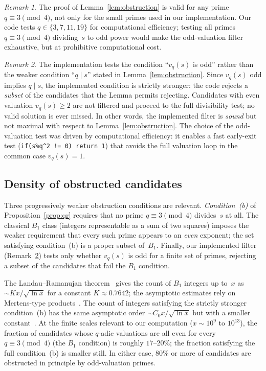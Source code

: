 \documentclass[11pt]{article}
\theoremstyle{definition}
\theoremstyle{remark}
\newtheorem{remark}{Remark}
\numberwithin{equation}{section}
\newcommand{\vq}[1]{v_{#1}}
\begin{document}
\begin{remark}\label{rem:filter_general}
The proof of Lemma~\ref{lem:obstruction} is valid for any prime
$q \equiv 3 \pmod{4}$, not only for the small primes used in our
implementation.  Our code tests $q \in \{3, 7, 11, 19\}$ for
computational efficiency; testing all primes $q \equiv 3 \pmod{4}$
dividing~$s$ to odd power would make the odd-valuation filter
exhaustive, but at prohibitive computational cost.
\end{remark}

\begin{remark}\label{rem:implemented_filter}
The implementation tests the condition ``$\vq{q}(s)$ is odd''
rather than the weaker condition ``$q \mid s$'' stated in
Lemma~\textup{\ref{lem:obstruction}}.
Since $\vq{q}(s)$ odd implies $q \mid s$, the implemented
condition is strictly stronger: the code rejects a
\emph{subset} of the candidates that the Lemma permits
rejecting.  Candidates with even valuation $\vq{q}(s) \ge 2$
are not filtered and proceed to the full divisibility test;
no valid solution is ever missed.  In other words, the
implemented filter is \emph{sound} but not maximal with
respect to Lemma~\textup{\ref{lem:obstruction}}.
The choice of the odd-valuation test was driven by
computational efficiency: it enables a fast early-exit test
(\texttt{if(s\%q\^{}2 != 0) return 1}) that avoids
the full valuation loop in the common case $\vq{q}(s) = 1$.
\end{remark}

\subsection{Density of obstructed candidates}

Three progressively weaker obstruction conditions are relevant.
\emph{Condition~\textup{(b)}} of Proposition~\ref{prop:qr}
requires that no prime $q \equiv 3 \pmod{4}$ divides~$s$ at all.
The classical $B_1$ class (integers representable as a sum of two
squares) imposes the weaker requirement that every such prime
appears to an \emph{even} exponent; the set satisfying condition~(b)
is a proper subset of~$B_1$.
Finally, our implemented filter (Remark~\ref{rem:implemented_filter})
tests only whether $\vq{q}(s)$ is odd for a finite set of primes,
rejecting a subset of the candidates that fail the $B_1$ condition.

The Landau--Ramanujan theorem~\cite{Landau1908} gives the count of
$B_1$ integers up to~$x$ as $\sim K x / \sqrt{\ln x}$ for a
constant $K \approx 0.7642$; the asymptotic estimates rely on
Mertens-type products~\cite{Mertens1874,Tenenbaum1995}.
The count of integers satisfying the
strictly stronger condition~(b) has the same asymptotic order
$\sim C_0 x / \sqrt{\ln x}$ but with a smaller
constant~\cite{Tenenbaum1995}.
At the finite scales relevant to our computation ($x \sim 10^{9}$
to $10^{13}$), the fraction of candidates whose $q$-adic valuations
are all even for every $q \equiv 3 \pmod{4}$ (the $B_1$ condition)
is roughly $17$--$20\%$; the fraction satisfying the full
condition~(b) is smaller still.
In either case, $80\%$ or more of candidates are obstructed in
principle by odd-valuation primes.
\end{document}
